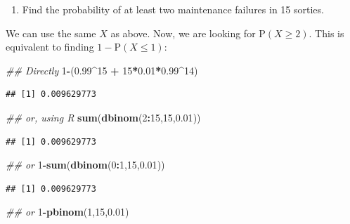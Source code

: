 \documentclass[
]{book}
\newenvironment{Shaded}{\begin{snugshade}}{\end{snugshade}}
\newcommand{\CommentTok}[1]{\textcolor[rgb]{0.56,0.35,0.01}{\textit{#1}}}
\newcommand{\DecValTok}[1]{\textcolor[rgb]{0.00,0.00,0.81}{#1}}
\newcommand{\FloatTok}[1]{\textcolor[rgb]{0.00,0.00,0.81}{#1}}
\newcommand{\KeywordTok}[1]{\textcolor[rgb]{0.13,0.29,0.53}{\textbf{#1}}}
\newcommand{\NormalTok}[1]{#1}
\newcommand{\OperatorTok}[1]{\textcolor[rgb]{0.81,0.36,0.00}{\textbf{#1}}}
\newcommand{\StringTok}[1]{\textcolor[rgb]{0.31,0.60,0.02}{#1}}
\providecommand{\tightlist}{%
  \setlength{\itemsep}{0pt}\setlength{\parskip}{0pt}}
\begin{document}
\begin{enumerate}
\def\labelenumi{\alph{enumi}.}
\setcounter{enumi}{1}
\tightlist
\item
  Find the probability of at least two maintenance failures in 15 sorties.
\end{enumerate}

We can use the same \(X\) as above. Now, we are looking for \(\mbox{P}(X\geq 2)\). This is equivalent to finding \(1-\mbox{P}(X\leq 1)\):

\begin{Shaded}
\begin{Highlighting}[]
\CommentTok{## Directly}
\DecValTok{1}\OperatorTok{-}\NormalTok{(}\FloatTok{0.99}\OperatorTok{^}\DecValTok{15} \OperatorTok{+}\StringTok{ }\DecValTok{15}\OperatorTok{*}\FloatTok{0.01}\OperatorTok{*}\FloatTok{0.99}\OperatorTok{^}\DecValTok{14}\NormalTok{)}
\end{Highlighting}
\end{Shaded}

\begin{verbatim}
## [1] 0.009629773
\end{verbatim}

\begin{Shaded}
\begin{Highlighting}[]
\CommentTok{## or, using R}
\KeywordTok{sum}\NormalTok{(}\KeywordTok{dbinom}\NormalTok{(}\DecValTok{2}\OperatorTok{:}\DecValTok{15}\NormalTok{,}\DecValTok{15}\NormalTok{,}\FloatTok{0.01}\NormalTok{))}
\end{Highlighting}
\end{Shaded}

\begin{verbatim}
## [1] 0.009629773
\end{verbatim}

\begin{Shaded}
\begin{Highlighting}[]
\CommentTok{## or}
\DecValTok{1}\OperatorTok{-}\KeywordTok{sum}\NormalTok{(}\KeywordTok{dbinom}\NormalTok{(}\DecValTok{0}\OperatorTok{:}\DecValTok{1}\NormalTok{,}\DecValTok{15}\NormalTok{,}\FloatTok{0.01}\NormalTok{))}
\end{Highlighting}
\end{Shaded}

\begin{verbatim}
## [1] 0.009629773
\end{verbatim}

\begin{Shaded}
\begin{Highlighting}[]
\CommentTok{## or}
\DecValTok{1}\OperatorTok{-}\KeywordTok{pbinom}\NormalTok{(}\DecValTok{1}\NormalTok{,}\DecValTok{15}\NormalTok{,}\FloatTok{0.01}\NormalTok{)}
\end{Highlighting}
\end{Shaded}
\end{document}
